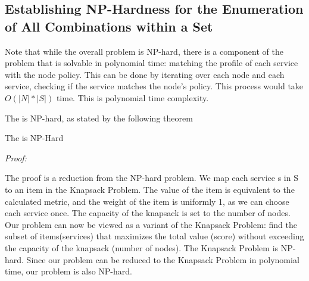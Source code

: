 \subsection{Establishing NP-Hardness for the Enumeration of All Combinations within a Set}
\begin{definition}

\end{definition}

Note that while the overall problem is NP-hard, there is a component of the problem that is solvable in polynomial time: matching the profile of each service with the node policy.
This can be done by iterating over each node and each service, checking if the service matches the node’s policy.
This process would take $O(|N|*|S|)$ time. This is polynomial time complexity.

The \problem is NP-hard, as stated by the following theorem
\begin{theorem}
  The \problem is NP-Hard
\end{theorem}
\emph{Proof: }

The proof is a reduction from the NP-hard problem. We map each service s in S to an item in the Knapsack Problem.
The value of the item is equivalent to the calculated metric, and the weight of the item is uniformly 1, as we can choose each service once. The capacity of the knapsack is set to the number of nodes.
Our problem can now be viewed as a variant of the Knapsack Problem: find the subset of items(services)
that maximizes the total value (score) without exceeding the capacity of the knapsack (number of nodes).
The Knapsack Problem is NP-hard.
Since our problem can be reduced to the Knapsack Problem in polynomial time, our problem is also NP-hard.


